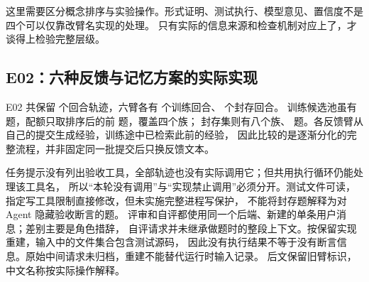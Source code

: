 这里需要区分概念排序与实验操作。形式证明、测试执行、模型意见、置信度不是四个可以仅靠改臂名实现的处理。
只有实际的信息来源和检查机制对应上了，才谈得上检验完整层级。

\subsection{E02：六种反馈与记忆方案的实际实现}

E02 共保留  个回合轨迹，六臂各有  个训练回合、 个封存回合。
训练候选池虽有  题，配额只取排序后的前  题，覆盖四个族；
封存集则有八个族、 题。各反馈臂从自己的提交生成经验，训练途中已检索此前的经验，
因此比较的是逐渐分化的完整流程，并非固定同一批提交后只换反馈文本。

任务提示没有列出验收工具，全部轨迹也没有实际调用它；但共用执行循环仍能处理该工具名，
所以“本轮没有调用”与“实现禁止调用”必须分开。测试文件可读，指定写工具限制直接修改，但未实施完整进程写保护，
不能将封存题解释为对 Agent 隐藏验收断言的题。
评审和自评都使用同一个后端、新建的单条用户消息；差别主要是角色措辞，
自评请求并未继承做题时的整段上下文。按保留实现重建，输入中的文件集合包含测试源码，
因此没有执行结果不等于没有断言信息。原始中间请求未归档，重建不能替代运行时输入记录。
后文保留旧臂标识，中文名称按实际操作解释。

